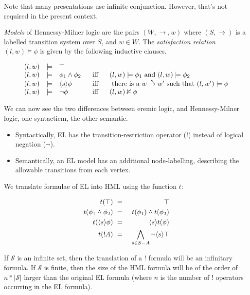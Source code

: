 \NI Note that many presentations use infinite conjunction. However,
that's not required in the present context.

 \emph{Models} of Hennessy-Milner logic are the pairs $(W,
\rightarrow, w)$ where $(S, \rightarrow)$ is a labelled transition
system over $S$, and $w \in W$.  The \emph{satisfaction relation} $(l,
w) \models \phi$ is given by the following inductive clauses.

\[
\begin{array}{lclcl}
  (l,w) & \models & \top  \\
  (l,w) & \models & \phi_1 \land \phi_2 &\  \mbox{ iff }\  & (l,w)  \models \phi_1 \mbox { and } (l,w) \models \phi_2  \\
  (l,w) & \models & \langle s \rangle \phi & \mbox{ iff } & \mbox{ there is a } w \xrightarrow{s} w' \mbox { such that } (l,w') \models \phi  \\
  (l,w) & \models & \neg \phi & \mbox{ iff } & (l,w)  \nvDash \phi 
\end{array}
\]

\NI We can now see the two differences between eremic logic, and
Hennessy-Milner logic, one syntacticm, the other semantic.

\begin{itemize}

\item Syntactically, EL has the transition-restriction operator ($!$)
  instead of logical negation ($\neg$).

\item Semantically, an EL model has an additional node-labelling,
  describing the allowable transitions from each vertex.

\end{itemize}

\NI We translate formulae of EL into HML using the function $t$:

\begin{eqnarray*}
  t(\top) & \ = \ & \top  \\
  t(\phi_1 \land \phi_2) & \ = \ & t(\phi_1) \land t(\phi_2)  \\
  t(\langle s \rangle \phi) & \ = \ & \langle s \rangle t(\phi)  \\
  t(! A) & \ = \ & \bigwedge_{s \in S - A} \neg \langle s \rangle \top 
\end{eqnarray*}

\NI If $\mathcal{S}$ is an infinite set, then the translation of a $!$
formula will be an infinitary formula.  If $\mathcal{S}$ is finite,
then the size of the HML formula will be of the order of $n *
|\mathcal{S}|$ larger than the original EL formula (where $n$ is the
number of $!$ operators occurring in the EL formula).

